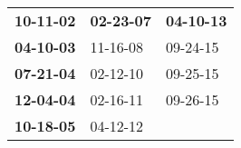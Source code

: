 \begin{supertabular}{p{0.33\columnwidth}p{0.33\columnwidth}p{0.33\columnwidth}}
 \textbf{10-11-02\textsuperscript{}} &  \textbf{02-23-07\textsuperscript{}} &  \textbf{04-10-13\textsuperscript{}} \\
 \textbf{04-10-03\textsuperscript{}} &           11-16-08\textsuperscript{} &           09-24-15\textsuperscript{} \\
 \textbf{07-21-04\textsuperscript{}} &           02-12-10\textsuperscript{} &           09-25-15\textsuperscript{} \\
 \textbf{12-04-04\textsuperscript{}} &           02-16-11\textsuperscript{} &           09-26-15\textsuperscript{} \\
 \textbf{10-18-05\textsuperscript{}} &           04-12-12\textsuperscript{} &                                      \\
\end{supertabular}
